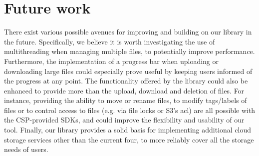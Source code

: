 \section{Future work}
There exist various possible avenues for improving and building on our library in the future. Specifically, we believe it is worth investigating the use of multithreading when managing multiple files, to potentially improve performance.  Furthermore, the implementation of a progress bar when uploading or downloading large files could especially prove useful by keeping users informed of the progress at any point. The functionality offered by the library  could also be enhanced to provide more than the upload, download and deletion of files. For instance, providing the ability to move or rename files, to modify tags/labels of files or to control access to files (e.g. via file locks or S3's \ac{acl}) are all possible with the CSP-provided SDKs, and could improve the flexibility and usability of our tool. Finally, our library provides a solid basis for implementing additional cloud storage services other than the current four, to more reliably cover all the storage needs of users. 